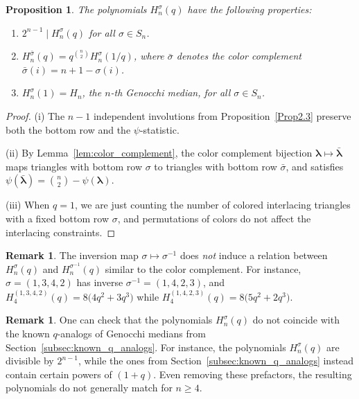 \documentclass[10pt,a4paper]{amsart}
\numberwithin{equation}{section}
\newtheorem{Proposition}[Theorem]{Proposition}
\theoremstyle{definition}
\newtheorem{Remark}[Theorem]{Remark}
\begin{document}
\begin{Proposition}\label{prop:H_sigma_properties} The polynomials $H_n^\sigma(q)$ have the
	following properties:
	\begin{enumerate}[\rm (i)]\itemsep=0pt
		\item $2^{n-1} \mid H_n^\sigma(q)$ for all $\sigma \in S_n$.
		\item
		$H_n^{\bar\sigma}(q) = q^{\binom{n}{2}} H_n^\sigma(1/q)$, where
		$\bar\sigma$ denotes the color complement
		$\bar\sigma(i) = n+1-\sigma(i)$.
		\item $H_n^{\sigma}(1)=H_n$, the $n$-th Genocchi median, for all $\sigma \in S_n$.
	\end{enumerate}
\end{Proposition}
\begin{proof}
(i) The $n-1$ independent involutions from Proposition~\ref{Prop2.3}
		preserve both the bottom row and the $\psi$-statistic.

(ii) By Lemma~\ref{lem:color_complement}, the color complement bijection
		$\boldsymbol\lambda \mapsto \bar{\boldsymbol\lambda}$ maps triangles
		with bottom row $\sigma$ to triangles with bottom row $\bar\sigma$, and
		satisfies
		$\psi(\bar{\boldsymbol\lambda}) = \binom{n}{2} - \psi(\boldsymbol\lambda)$.

(iii) When $q=1$, we are just counting the number of colored interlacing triangles
		with a fixed bottom row $\sigma$, and permutations of colors do not
		affect the interlacing constraints.
\end{proof}

\begin{Remark}
	\label{rem:inverse_not_palindromic} The inversion map
	$\sigma \mapsto \sigma^{-1}$ does \emph{not} induce a relation between
	$H_n^\sigma(q)$ and $H_n^{\sigma^{-1}}(q)$ similar to the color complement.
	For instance, $\sigma = (1,3,4,2)$ has inverse $\sigma^{-1} = (1,4,2,3)$,
	and $H_4^{(1,3,4,2)}(q) = 8\bigl(4q^2 + 3q^3\bigr)$ while
	$H_4^{(1,4,2,3)}(q) = 8\bigl(5q^2 + 2q^3\bigr)$.
\end{Remark}

\begin{Remark}
	\label{rem:H_sigma_not_known} One can check that the polynomials
	$H_n^\sigma(q)$ do not coincide with the known $q$-analogs of Genocchi
	medians from Section~\ref{subsec:known_q_analogs}.
	For instance, the polynomials $H_n^\sigma(q)$ are divisible by $2^{n-1}$,
	while the ones from Section~\ref{subsec:known_q_analogs} instead contain certain
	powers of $(1+q)$.
	Even removing these prefactors, the resulting polynomials do not generally
	match for $n\ge4$.
\end{Remark}
\end{document}

